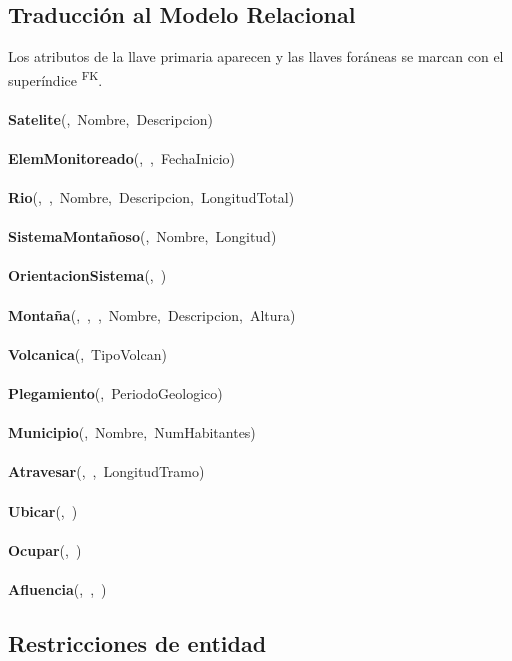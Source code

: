 \subsection*{Traducción al Modelo Relacional}
\noindent
Los atributos de la llave primaria aparecen  y las llaves foráneas se marcan con el superíndice \textsuperscript{FK}.\\ \\
\textbf{Satelite}(,\ Nombre,\ Descripcion)\\ \\
\textbf{ElemMonitoreado}(,\ ,\ FechaInicio)\\ \\
\textbf{Rio}(,\ ,\ Nombre,\ Descripcion,\ LongitudTotal)\\ \\
\textbf{SistemaMontañoso}(,\ Nombre,\ Longitud)\\ \\
\textbf{OrientacionSistema}(,\ )\\ \\
\textbf{Montaña}(,\ ,\ ,\ Nombre,\ Descripcion,\ Altura)\\ \\
\textbf{Volcanica}(,\ TipoVolcan)\\ \\
\textbf{Plegamiento}(,\ PeriodoGeologico)\\ \\
\textbf{Municipio}(,\ Nombre,\ NumHabitantes)\\ \\
\textbf{Atravesar}(,\ ,\ LongitudTramo)\\ \\
\textbf{Ubicar}(,\ )\\ \\
\textbf{Ocupar}(,\ )\\ \\
\textbf{Afluencia}(,\ ,\ )


\subsection*{Restricciones de entidad}


